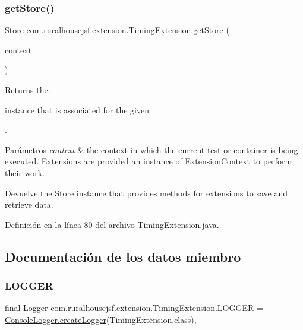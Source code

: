 \subsubsection{\texorpdfstring{getStore()}{getStore()}}
{\footnotesize\ttfamily Store com.\+ruralhousejsf.\+extension.\+Timing\+Extension.\+get\+Store (\begin{DoxyParamCaption}\item[{Extension\+Context}]{context }\end{DoxyParamCaption})\hspace{0.3cm}{\ttfamily [private]}}



Returns the. 


\begin{DoxyCode}{0}
\end{DoxyCode}
 instance that is associated for the given 
\begin{DoxyCode}{0}
\end{DoxyCode}
 .


\begin{DoxyParams}{Parámetros}
{\em context} & the context in which the current test or container is being executed. Extensions are provided an instance of Extension\+Context to perform their work.\\
\hline
\end{DoxyParams}
\begin{DoxyReturn}{Devuelve}
the Store instance that provides methods for extensions to save and retrieve data. 
\end{DoxyReturn}


Definición en la línea 80 del archivo Timing\+Extension.\+java.



\subsection{Documentación de los datos miembro}
\mbox{\label{a00268_a6c2790b974e4ae4484a4ad0f67ead486}} 
\subsubsection{\texorpdfstring{LOGGER}{LOGGER}}
{\footnotesize\ttfamily final Logger com.\+ruralhousejsf.\+extension.\+Timing\+Extension.\+L\+O\+G\+G\+ER = \mbox{\hyperlink{a00220_a520321643663e37d95761134a35505cd}{Console\+Logger.\+create\+Logger}}(Timing\+Extension.\+class)\hspace{0.3cm}{\ttfamily [static]}, {\ttfamily [private]}}




